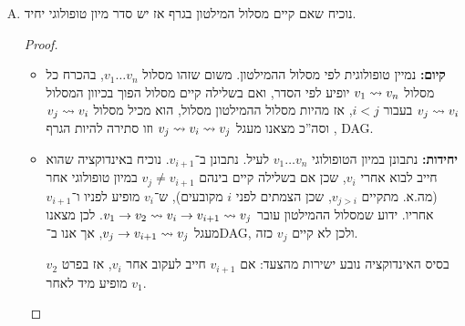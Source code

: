\documentclass[]{../../../../tex/classes/homework}
\begin{document}
	\begin{enumerate}[(A)]
		\item נוכיח שאם קיים מסלול המילטון בגרף אז יש סדר מיון טופולוגי יחיד. \begin{proof}
			\begin{itemize}
				\item \textbf{קיום: }נמיין טופולוגית לפי מסלול ההמילטון. משום שזהו מסלול $v_1 \dots v_n$, בהכרח כל מסלול $v_1 \rightsquigarrow v_n$ יופיע לפי הסדר, ואם בשלילה קיים מסלול הפוך בכיוון המסלול $v_j \rightsquigarrow v_{i}$ בעבור $i < j$, אז מהיות מסלול ההמילטון מסלול, הוא מכיל מסלול $v_j \rightsquigarrow v_i$, וסה''כ מצאנו מעגל $v_j \rightsquigarrow v_i \rightsquigarrow v_j$ וזו סתירה להיות הגרף DAG. 
				\item \textbf{יחידות: }נתבונן במיון הטופולוגי $v_1 \dots v_n$ לעיל. נתבונן ב־$v_{i + 1}$. נוכיח באינדוקציה שהוא חייב לבוא אחרי $v_i$, שכן אם בשלילה קיים בינהם $v_j \neq v_{i + 1}$ במיון טופולוגי אחר (מה.א. מתקיים $v_{j > i}$, שכן הצמתים לפני $i$ מקובעים), ש־$v_i$ מופיע לפניו ו־$v_{i + 1}$ אחריו. ידוע שמסלול ההמילטון עובר $v_1 \to v_2 \rightsquigarrow v_i \to v_{i +1} \rightsquigarrow v_j$. לכן מצאנו מעגל $v_j \to v_{i + 1} \rightsquigarrow v_j$, אך אנו ב־DAG, ולכן לא קיים $v_j$ כזה. 
				
				בסיס האינדוקציה נובע ישירות מהצעד: אם $v_{i + 1}$ חייב לעקוב אחר $v_i$, אז בפרט $v_2$ מופיע מיד לאחר $v_1$. 
				

\end{itemize}
\end{proof}
\end{enumerate}
\end{document}
